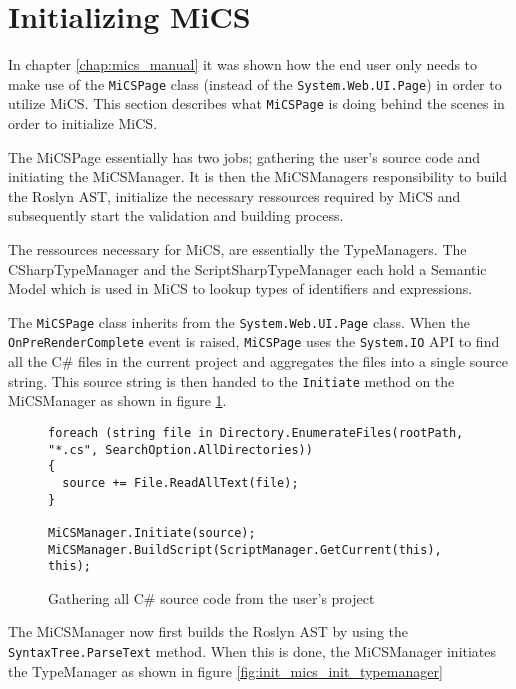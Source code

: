 \section{Initializing MiCS} %
\label{sec:initializing_mics}

In chapter \ref{chap:mics_manual} it was shown how the end user only needs to make use of the \texttt{MiCSPage} class (instead of the \texttt{System.Web.UI.Page}) in order to utilize MiCS. This section describes what \texttt{MiCSPage} is doing behind the scenes in order to initialize MiCS.

The MiCSPage essentially has two jobs; gathering the user's source code and initiating the MiCSManager. It is then the MiCSManagers responsibility to build the Roslyn AST, initialize the necessary ressources required by MiCS and subsequently start the validation and building process.

The ressources necessary for MiCS, are essentially the TypeManagers. The CSharpTypeManager and the ScriptSharpTypeManager each hold a Semantic Model which is used in MiCS to lookup types of identifiers and expressions.

The \texttt{MiCSPage} class inherits from the \texttt{System.Web.UI.Page} class. When the \texttt{OnPreRenderComplete} event is raised, \texttt{MiCSPage} uses the \texttt{System.IO} API to find all the C\# files in the current project and aggregates the files into a single source string. This source string is then handed to the \texttt{Initiate} method on the MiCSManager as shown in figure \ref{fig:init_mics_gather_source_code}.

\begin{figure}[H]
\begin{lstlisting}[language=CSharp,classoffset=1,morekeywords={Directory,SearcOption,File,MiCSManager,ScriptManager}]
foreach (string file in Directory.EnumerateFiles(rootPath, "*.cs", SearchOption.AllDirectories))
{
  source += File.ReadAllText(file);
}

MiCSManager.Initiate(source);
MiCSManager.BuildScript(ScriptManager.GetCurrent(this), this);
\end{lstlisting}
\caption{Gathering all C\# source code from the user's project}
\label{fig:init_mics_gather_source_code}
\end{figure}

The MiCSManager now first builds the Roslyn AST by using the \texttt{SyntaxTree.ParseText} method. When this is done, the MiCSManager initiates the TypeManager as shown in figure \ref{fig:init_mics_init_typemanager}

